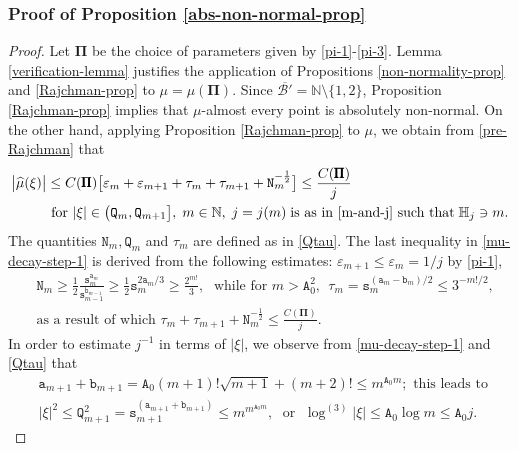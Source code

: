 \documentclass[12pt, twoside]{article}
\theoremstyle{definition}
\numberwithin{equation}{section}
\begin{document}
\subsubsection{Proof of Proposition \ref{abs-non-normal-prop}} 
\begin{proof} 
Let $\pmb{\Pi}$ be the choice of parameters given by \eqref{pi-1}-\eqref{pi-3}. Lemma \ref{verification-lemma} justifies the application of Propositions  \ref{non-normality-prop} and \ref{Rajchman-prop} to $\mu = \mu(\pmb{\Pi})$. Since $\overline{\mathscr{B}'} = \mathbb N \setminus \{1, 2\}$, Proposition \ref{Rajchman-prop} implies that $\mu$-almost every point is absolutely non-normal.  On the other hand, applying Proposition \ref{Rajchman-prop} to $\mu$, we obtain from \eqref{pre-Rajchman} that 
\begin{align} 
\bigl| \widehat{\mu}(\xi) \bigr| &\leq C(\pmb{\Pi}) \bigl[\varepsilon_m + \varepsilon_{m+1} + \tau_m + \tau_{m+1} + \mathtt N_m^{-\frac{1}{2}}\bigr] \leq \frac{C(\pmb{\Pi})}{j} \label{mu-decay-step-1} \\ &\text{ for } |\xi| \in \bigl(\mathtt Q_m, \mathtt Q_{m+1} \bigr], \; m \in \mathbb N, \; j=j(m)\;\text{is as in \eqref{m-and-j} such that}\; \mathbb H_j \ni m. \nonumber 
\end{align} 
The quantities $\mathtt N_m, \mathtt Q_m$ and $\tau_m$ are defined  as in \eqref{Qtau}. The last inequality in \eqref{mu-decay-step-1} is derived from the following estimates: $\varepsilon_{m+1} \le \varepsilon_m = 1/j$ by \eqref{pi-1},   
\begin{align*} 
&\mathtt N_m \geq \frac{1}{2} \frac{\mathtt s_m^{\mathtt a_m}}{\mathtt s_{m-1}^{\mathtt b_{m-1}}} \geq \frac{1}{2} \mathtt s_{m}^{2\mathtt a_m/3} \geq \frac{2^{m!}}{3}, \; \text{ while for $m > \mathtt A_0^2$, } \; \tau_m = \mathtt s_m^{(\mathtt a_m-\mathtt b_m)/2} \leq 3^{-m!/2}, \\ 
&\text{as a result of which } \tau_m + \tau_{m+1} + \mathtt N_m^{-\frac{1}{2}} \leq \frac{C(\pmb{\Pi})}{j}.   
\end{align*}  
In order to estimate $j^{-1}$ in terms of $|\xi|$, we observe from \eqref{mu-decay-step-1} and \eqref{Qtau} that 
\begin{align} 
&\mathtt a_{m+1} + \mathtt b_{m+1} = \mathtt A_0 (m+1)! \sqrt{m+1} + (m+2)! \leq m^{\mathtt A_0 m}; \text{ this leads to }\\
&|\xi|^2 \leq \mathtt Q_{m+1}^2 = \mathtt s_{m+1}^{(\mathtt a_{m+1} + \mathtt b_{m+1})} \leq m^{m^{\mathtt A_0 m}}, \; \text{ or } \;  \log^{(3)}|\xi| \leq \mathtt A_0 \log m \leq \mathtt A_0 j.  \label{mu-decay-step-2} 

\end{align}
\end{proof}
\end{document}

